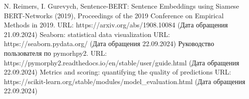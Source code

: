 \begin{thebibliography}{}
	N. Reimers, I. Gurevych, Sentence-BERT: Sentence Embeddings using Siamese BERT-Networks (2019), Proceedings of the 2019 Conference on Empirical Methods in 2019.
	URL: https://arxiv.org/abs/1908.10084 (Дата обращения 21.09.2024)
	Seaborn: statistical data visualization
	URL: https://seaborn.pydata.org/ (Дата обращения 22.09.2024)
	Руководство пользователя по pymorhpy2.
	URL: https://pymorphy2.readthedocs.io/en/stable/user/guide.html (Дата обращения 22.09.2024)
	Metrics and scoring: quantifying the quality of predictions
	URL: https://scikit-learn.org/stable/modules/model\_evaluation.html (Дата обращения 22.09.2024)
\end{thebibliography}